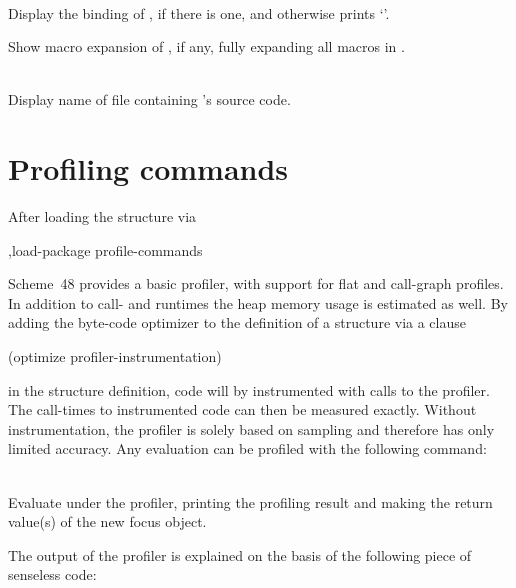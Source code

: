 \begin{description}
\item {}\\
    Display the binding of , if there is one, and otherwise
    prints `'.
 
\item {}
    Show macro expansion of , if any, fully expanding all 
    macros in .

\item {}\\
    Display name of file containing 's source code.
\end{description}


\section{Profiling commands}
\label{profiling-commands}

After loading the  structure via
%
\begin{example}
,load-package profile-commands  
\end{example}
%
Scheme~48 provides a basic profiler, with support for flat and call-graph profiles.
In addition to call- and runtimes the heap memory usage is estimated as well.
By adding the byte-code optimizer  to the definition
of a structure via a clause
%
\begin{example}
  (optimize profiler-instrumentation)
\end{example}
%
in the structure definition, code will by instrumented with calls to the profiler. The call-times to
instrumented code can then be measured exactly.
Without instrumentation, the profiler is solely based on sampling and therefore has only
limited accuracy.
Any evaluation can be profiled with the following command:

\begin{description}

\item {}\\
    Evaluate  under the profiler, printing the profiling result and making the
    return value(s) of  the new focus object.

\end{description}

The output of the profiler is explained on the basis of the following piece of senseless code:

